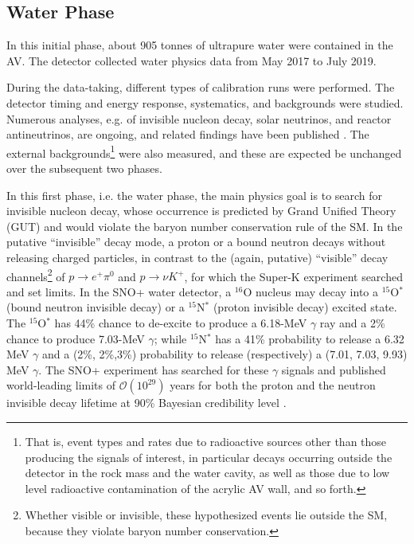 \subsection{Water Phase} \label{sect:waterPhase}

In this initial phase, about 905 tonnes of ultrapure water were contained in the AV. The detector collected water physics data from May 2017 to July 2019.

During the data-taking, different types of calibration runs were performed. The detector timing and energy response, systematics, and backgrounds were studied. Numerous analyses, e.g. of invisible nucleon decay, solar neutrinos, and reactor antineutrinos, are ongoing, and related findings have been published \cite{anderson2019search,anderson2019measurement,anderson2020measurement,anderson2021optical}. The external backgrounds\footnote{That is, event types and rates due to radioactive sources other than those producing the signals of interest, in particular decays occurring outside the detector in the rock mass and the water cavity, as well as those due to low level radioactive contamination of the acrylic AV wall, and so forth.} were also measured, and these are expected be unchanged over the subsequent two phases.

In this first phase, i.e. the water phase, the main physics goal is to search for invisible nucleon decay, whose occurrence is predicted by Grand Unified Theory (GUT) and would violate the baryon number conservation rule of the SM. In the putative ``invisible'' decay mode, a proton or a bound neutron decays without releasing charged particles, in contrast to the (again, putative) ``visible'' decay channels\footnote{Whether visible or invisible, these hypothesized events lie outside the SM, because they violate baryon number conservation.} of $p\to e^+ \pi^0$ and $p\to\nu K^+$, for which the Super-K experiment searched and set limits. In the SNO+ water detector, a $^{16}$O nucleus may decay into a $^{15}$O$^*$ (bound neutron invisible decay) or a $ ^{15}$N$^*$ (proton invisible decay) excited state. The $^{15}$O$^*$ has 44\% chance to de-excite to produce a 6.18-MeV $\gamma$ ray and a 2\% chance to produce 7.03-MeV $\gamma$; while $^{15}$N$^*$ has a 41\% probability to release a 6.32 MeV $\gamma$ and a (2\%, 2\%,3\%) probability to release (respectively) a (7.01, 7.03, 9.93) MeV $\gamma$. The SNO+ experiment has searched for these $\gamma$ signals and published world-leading limits of $\mathcal{O}(10^{29})$ years for both the proton and the neutron invisible decay lifetime at 90\% Bayesian credibility level \cite{anderson2019search}. 

